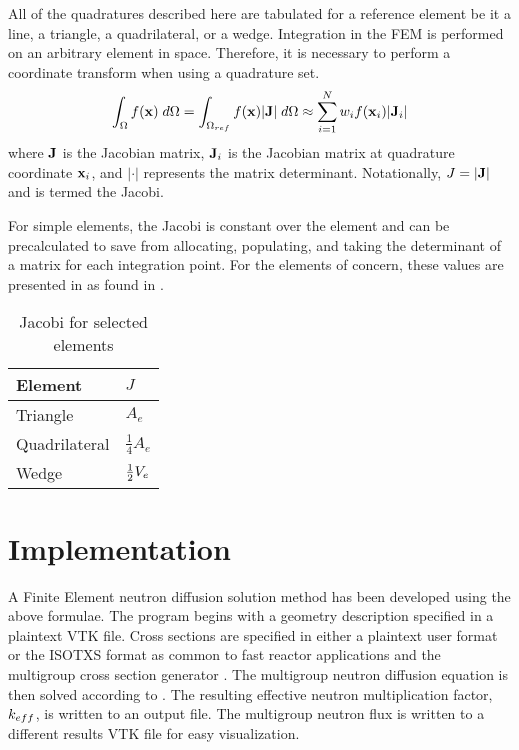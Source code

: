     All of the quadratures described here are tabulated for a reference element
    be it a line, a triangle, a quadrilateral, or a wedge. Integration in the 
    FEM is performed on an arbitrary element in space. Therefore, it is 
    necessary to perform a coordinate transform when using a quadrature set.
    \begin{equation}
      \int_{\Omega} f(\mathbf{x}) \;d\Omega = 
        \int_{\Omega_{ref}} f(\mathbf{x}) \lvert \mathbf{J} \rvert \;d\Omega \approx
        \sum_{i=1}^{N} w_i f(\mathbf{x}_i) \lvert \mathbf{J}_i \rvert
    \end{equation}
    where $\mathbf{J}$ is the Jacobian matrix, $\mathbf{J}_i$ is the Jacobian matrix at 
    quadrature coordinate $\mathbf{x}_i$, and $\lvert \cdot \rvert$ represents
    the matrix determinant. Notationally, $J=\lvert \mathbf{J} \rvert$ and is termed
    the Jacobi.
    
    For simple elements, the Jacobi is constant over the element and can be
    precalculated to save from allocating, populating, and taking the 
    determinant of a matrix for each integration point. For the elements of 
    concern, these values are presented in  as found in 
    \cite{textbookcolorado}.
    \begin{table}
      \caption{Jacobi for selected elements}
      \label{tab:jacobi}
      \begin{center}
        \begin{tabular}{ll}
          \toprule
          Element & $J$ \\
          \midrule
          Triangle      & $A_e$ \\
          Quadrilateral & $\frac{1}{4} A_e$ \\
          Wedge         & $\frac{1}{2} V_e$ \\
          \bottomrule
        \end{tabular}
      \end{center}
    \end{table}

\section{Implementation}
  A Finite Element neutron diffusion solution method has been developed using 
  the above formulae. The program begins with a geometry description specified
  in a plaintext VTK file. Cross sections are specified in either a plaintext
  user format or the ISOTXS format as common to fast reactor applications 
  and the multigroup cross section generator \mcc. The multigroup neutron 
  diffusion equation is then solved according to .
  The resulting effective neutron multiplication factor, $k_{eff}$, is written to
  an output file. The multigroup neutron flux is written to a different results
  VTK file for easy visualization.
